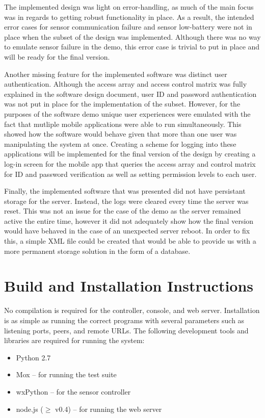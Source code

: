 \documentclass{article}
\begin{document}
The implemented design was light on error-handling, as much of the main focus
was in regards to getting robust functionality in place. As a result, the intended
error cases for sensor communication failure and sensor low-battery were not
in place when the subset of the design was implemented. Although there was no
way to emulate sensor failure in the demo, this error case is trivial to put in
place and will be ready for the final version.

Another missing feature for the implemented software was distinct user
authentication. Although the access array and access control matrix was fully
explained in the software design document, user ID and password authentication
was not put in place for the implementation of the subset. However, for the
purposes of the software demo unique user experiences were emulated with the
fact that mutliple mobile applications were able to run simultaneously. This
showed how the software would behave given that more than one user was
manipulating the system at once. Creating a scheme for logging into these 
applications will be implemented for the final version of the design by 
creating a log-in screen for the mobile app that queries the access array
and control matrix for ID and password verification as well as setting permission
levels to each user.

Finally, the implemented software that was presented did not have persistant
storage for the server. Instead, the logs were cleared every time the server
was reset. This was not an issue for the case of the demo as the server remained
active the entire time, however it did not adequately show how the final version
would have behaved in the case of an unexpected server reboot. In order to fix
this, a simple XML file could be created that would be able to provide us with a
more permanent storage solution in the form of a database.

\section{Build and Installation Instructions}

No compilation is required for the controller, console, and web server.
Installation is as simple as running the correct programs with several
parameters such as listening ports, peers, and remote URLs. The following
development tools and libraries are required for running the
system:
\begin{itemize}
\item Python 2.7 
\item Mox -- for running the test suite
\item wxPython -- for the sensor controller
\item node.js ($\ge$ v0.4) -- for running the web server
\end{itemize}
\end{document}
